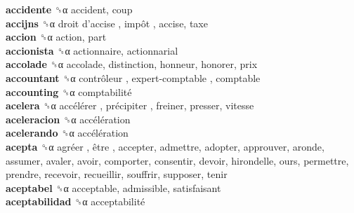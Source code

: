 \textbf{accidente} ␝α  accident, coup  \\
\textbf{accijns} ␝α   droit d’accise ,  impôt , accise, taxe  \\
\textbf{accion} ␝α  action, part  \\
\textbf{accionista} ␝α  actionnaire, actionnarial  \\
\textbf{accolade} ␝α  accolade, distinction, honneur, honorer, prix  \\
\textbf{accountant} ␝α   contrôleur ,  expert-comptable , comptable  \\
\textbf{accounting} ␝α   comptabilité   \\
\textbf{acelera} ␝α   accélérer ,  précipiter , freiner, presser, vitesse  \\
\textbf{aceleracion} ␝α   accélération   \\
\textbf{acelerando} ␝α   accélération   \\
\textbf{acepta} ␝α   agréer ,  être , accepter, admettre, adopter, approuver, aronde, assumer, avaler, avoir, comporter, consentir, devoir, hirondelle, ours, permettre, prendre, recevoir, recueillir, souffrir, supposer, tenir  \\
\textbf{aceptabel} ␝α  acceptable, admissible, satisfaisant  \\
\textbf{aceptabilidad} ␝α   acceptabilité   \\
